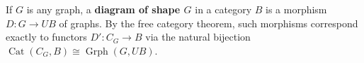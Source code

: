 If $G$ is any graph, a \textbf{diagram of shape $G$} in a category $B$ is a morphism $D: G \rightarrow UB$ of graphs. By the free category theorem, such morphisms correspond exactly to functors $D': C_G \rightarrow B$ via the natural bijection $\operatorname{Cat}(C_G, B) \cong \operatorname{Grph}(G, UB)$.